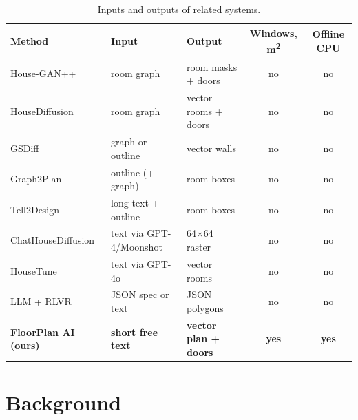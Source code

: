 \documentclass[11pt,a4paper]{article}
\begin{document}
\begin{table}[H]
\centering
\caption{Inputs and outputs of related systems.}
\label{tab:landscape}
\small
\begin{tabularx}{\linewidth}{l l l c c}
\toprule
\textbf{Method} & \textbf{Input} & \textbf{Output} & \textbf{Windows, m\textsuperscript{2}} & \textbf{Offline CPU}\\
\midrule
House-GAN++~\cite{housegan2}       & room graph            & room masks + doors      & no  & no\\
HouseDiffusion~\cite{housediffusion} & room graph          & vector rooms + doors    & no  & no\\
GSDiff~\cite{gsdiff}               & graph or outline      & vector walls            & no  & no\\
Graph2Plan~\cite{graph2plan}       & outline (+ graph)     & room boxes              & no  & no\\
Tell2Design~\cite{tell2design}     & long text + outline   & room boxes              & no  & no\\
ChatHouseDiffusion~\cite{chathousediffusion} & text via GPT-4/Moonshot & 64$\times$64 raster & no & no\\
HouseTune~\cite{housetune}         & text via GPT-4o       & vector rooms            & no  & no\\
LLM + RLVR~\cite{rlvr}             & JSON spec or text     & JSON polygons           & no  & no\\
\textbf{FloorPlan AI (ours)}       & \textbf{short free text} & \textbf{vector plan + doors} & \textbf{yes} & \textbf{yes}\\
\bottomrule
\end{tabularx}
\end{table}

\section{Background}
\end{document}
